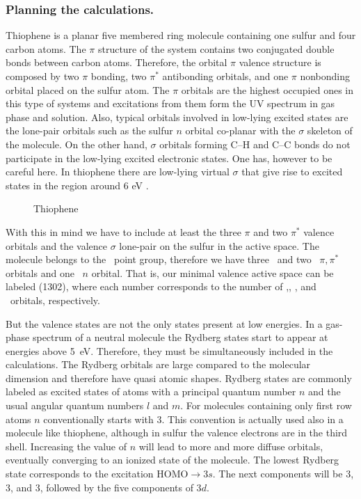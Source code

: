 \subsubsection{Planning the calculations.}

Thiophene is a planar five membered ring molecule containing one sulfur
and four carbon atoms. The $\pi$ structure of the system contains
two conjugated double bonds between carbon atoms. Therefore, the orbital
$\pi$ valence structure is composed by two $\pi$ bonding, two
$\pi^*$ antibonding orbitals, and one $\pi$ nonbonding orbital placed
on the sulfur atom.
The $\pi$ orbitals are the highest occupied ones in this type of 
systems and excitations from them form the UV
spectrum in gas phase and solution. Also, typical orbitals involved 
in low-lying excited states are the lone-pair orbitals such as the
sulfur $n$ orbital co-planar with the $\sigma$ skeleton of the
molecule. On the other hand, $\sigma$ orbitals forming C--H and C--C
bonds do not participate in the low-lying excited
electronic states. One has, however to be careful here. In thiophene there are
low-lying virtual $\sigma$ that give rise to excited states in the region around
6 eV \cite{Tozer:99a}.

\begin{figure}[hp]
\caption{\label{fig:thiophene}Thiophene}
\end{figure}


With this in mind we have to include at least the three $\pi$ 
and two $\pi^*$ valence orbitals and the valence $\sigma$ lone-pair 
on the sulfur in the active space. The molecule belongs
to the \Ctv\ point group, therefore we have three \bo\ and
two \at\ $\pi,\pi^*$ orbitals and one \ao\ $n$ orbital.
That is, our minimal valence active space can be labeled
(1302), where each number corresponds to the number of \ao,\bo,
\bt, and \at\ orbitals, respectively.


But the valence states are not the only states present at low energies.
In a gas-phase spectrum of a neutral molecule the Rydberg states start to
appear at energies above 5~eV. Therefore, they must be simultaneously
included in the calculations. The Rydberg orbitals are large compared
to the molecular dimension and therefore have quasi atomic shapes. Rydberg
states are commonly labeled as excited states of atoms with a principal
quantum number $n$ and the usual angular quantum numbers $l$ and $m$. 
For molecules containing only first row atoms $n$ conventionally starts
with 3. This convention is actually used also in a molecule like thiophene,
although in sulfur the valence electrons are in the third shell.
Increasing the value of $n$ will lead to more and more diffuse orbitals,
eventually converging to an ionized state of the molecule. The lowest
Rydberg state corresponds to the excitation HOMO$\to$3$s$.
The next components will be 3\px, 3\py, and 3\pz, followed by the
five components of 3$d$.

